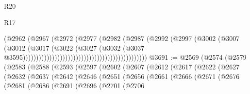\begin{lexlean}{R20}
\begin{lexlean}{R17}
\begin{coremodule}
{{{{{{{{{{{{{{{{{{{{{{{{{{{{{{{{{{{{{{{{{{{{{{{{{{{{{{{{{{{{{{{{{{{{{{{{{{{{{{{{{{{{{{{{{{{{{{{{{{{{{{{{{{{                                                                  (@2962
                                                                    (@2967
                                                                      (@2972
                                                                        (@2977
                                                                          (@2982
                                                                            (@2987
                                                                              (@2992
                                                                                (@2997
                                                                                  (@3002
                                                                                    (@3007
                                                                                      (@3012
                                                                                        (@3017
                                                                                          (@3022
                                                                                            (@3027
                                                                                              (@3032
                                                                                                (@3037
                                                                                                  @3595)))))))))))))))))))))))))))))))))))))))))))))))
@3691 := @2569
    (@2574
      (@2579
        (@2583
          (@2588
            (@2593
              (@2597
                (@2602
                  (@2607
                    (@2612
                      (@2617
                        (@2622
                          (@2627
                            (@2632
                              (@2637
                                (@2642
                                  (@2646
                                    (@2651
                                      (@2656
                                        (@2661
                                          (@2666
                                            (@2671
                                              (@2676
                                                (@2681
                                                  (@2686
                                                    (@2691
                                                      (@2696
                                                        (@2701
                                                          (@2706
}}}}}}}}}}}}}}}}}}}}}}}}}}}}}}}}}}}}}}}}}}}}}}}}}}}}}}}}}}}}}}}}}}}}}}}}}}}}}}}}}}}}}}}}}}}}}}}}}}}}}}}}}}}
\end{coremodule}
\end{lexlean}
\end{lexlean}
